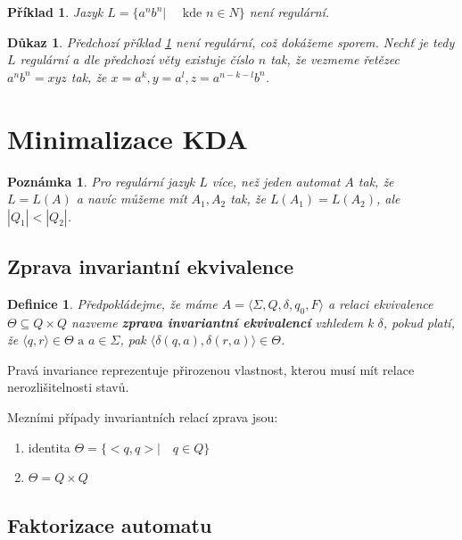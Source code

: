 \documentclass[10pt, a4paper, titlepage]{article}
\theoremstyle{note}
\newtheorem{definice}{Definice}
\newtheorem{dukaz}{Důkaz}
\newtheorem{priklad}{Příklad}
\newtheorem{poznamka}{Poznámka}
\begin{document}
\begin{priklad}\label{priklad-reg}
 Jazyk $L = \lbrace a^{n}b^{n} | \quad \text{ kde } n \in N \rbrace$ není regulární.
\end{priklad}

\begin{dukaz}
 Předchozí příklad \ref{priklad-reg} není regulární, což dokážeme sporem. Nechť je tedy $L$ regulární a dle předchozí
věty existuje číslo $n$ tak, že vezmeme řetězec $a^{n}b^{n} = xyz$ tak, že $x = a^{k}, y = a^{l}, z = a^{n-k-l}b^{n}$.
\end{dukaz}


\section{Minimalizace KDA}

\begin{poznamka}
Pro regulární jazyk $L$ více, než jeden automat $A$ tak, že $L = L(A)$ a navíc můžeme mít $A_{1}, A_{2}$ tak, že
$L(A_{1}) = L(A_{2})$, ale $|Q_{1}| < |Q_{2}|$.
\end{poznamka}

\subsection{Zprava invariantní ekvivalence}

\begin{definice}
Předpokládejme, že máme $A = \langle \Sigma, Q, \delta, q_{0}, F \rangle$ a relaci ekvivalence $\Theta \subseteq Q \times Q$ nazveme
\textbf{zprava invariantní ekvivalencí} vzhledem k $\delta$, pokud platí, že $\langle q,r  \rangle \in \Theta \text{ a } a \in \Sigma$,
pak $\langle  \delta(q, a), \delta(r, a) \rangle \in \Theta$.
\end{definice}

Pravá invariance reprezentuje přirozenou vlastnost, kterou musí mít relace nerozlišitelnosti stavů.

Mezními případy invariantních relací zprava jsou:
\begin{enumerate}
\item 
identita $\Theta = \lbrace <q,q> | \quad q \in Q \rbrace$
\item
$\Theta = Q \times Q$
\end{enumerate}

\subsection{Faktorizace automatu}
\end{document}
